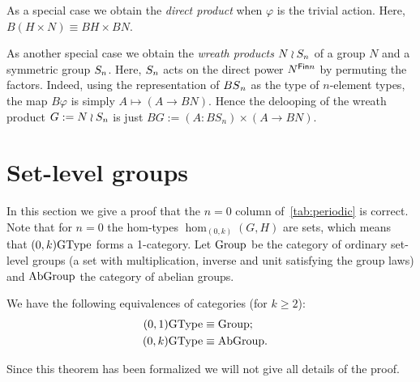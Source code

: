 As a special case we obtain the \emph{direct product} when $\varphi$
is the trivial action. Here, $B(H \times N) \equiv BH \times BN$.

As another special case we obtain the \emph{wreath products} $N \wr
S_n$ of a group $N$ and a symmetric group $S_n$. Here,
$S_n$ acts on the direct power $N^{\mathsf{Fin} n}$ by permuting the
factors. Indeed, using the representation of $\mathop{BS}_n$ as the type of
$n$-element types, the map $B\varphi$ is simply $A \mapsto (A \to
BN)$. Hence the delooping of the wreath product $G := N \wr S_n$
is just $BG:=(A:BS_n) \times (A \to BN)$.

\section{Set-level groups}
\label{sec:n=0}
In this section we give a proof that the $n=0$ column of~\cref{tab:periodic} is correct. 
Note that for $n=0$ the hom-types $\hom_{(0,k)}(G,H)$ are sets, which means that $(0,k)\mathrm{GType}$ forms a 1-category. %
Let $\mathrm{Group}$ be the category of ordinary set-level groups (a set with multiplication, inverse and unit satisfying the group laws) and $\mathrm{AbGroup}$ the category of abelian groups.
\begin{thm}
  We have the following equivalences of categories
  {\normalfont(}\/for $k\geq2${\normalfont):}
  \begin{align*}
    (0,1)\mathrm{GType} &\equiv \mathrm{Group};&&\\
    (0,k)\mathrm{GType} &\equiv \mathrm{AbGroup}.&&
  \end{align*}
\end{thm}
Since this theorem has been formalized we will not give all details of the proof.
